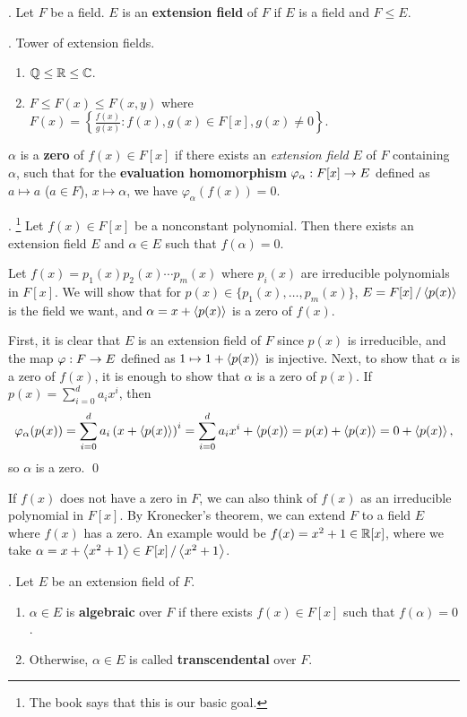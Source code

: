 .  Let \(F\) be a field. \(E\) is an \textbf{extension field} of \(F\) if \(E\) is a field and \(F \leq E\).

\ex. Tower of extension fields.
\begin{enumerate}
    \item \(\mathbb{Q} \leq \mathbb{R} \leq \mathbb{C}\).
    \item \(F \leq F(x) \leq F(x, y)\) where \(F(x) = \left\{\frac{f(x)}{g(x)} : f(x), g(x) \in F[x], g(x) \neq 0\right\}\).
\end{enumerate}

\recall \(\alpha\) is a \textbf{zero} of \(f(x) \in F[x]\) if there exists an \textit{extension field} \(E\) of \(F\) containing \(\alpha\), such that for the \textbf{evaluation homomorphism} \(\varphi_\alpha : F[x] \rightarrow E\) defined as \(a \mapsto a\) (\(a \in F\)), \(x \mapsto \alpha\), we have \(\varphi_\alpha(f(x)) = 0\).

\thm.  \footnote{The book says that this is our basic goal.} Let \(f(x) \in F[x]\) be a nonconstant polynomial. Then there exists an extension field \(E\) and \(\alpha \in E\) such that \(f(\alpha) = 0\).

\pf Let \(f(x) = p_1(x)p_2(x)\cdots p_m(x)\) where \(p_i(x)\) are irreducible polynomials in \(F[x]\). We will show that for \(p(x) \in \{p_1(x), \dots, p_m(x)\}\), \(E = F[x] \operatorname{/} \left\langle p(x) \right\rangle\) is the field we want, and \(\alpha = x + \left\langle p(x) \right\rangle\) is a zero of \(f(x)\).

First, it is clear that \(E\) is an extension field of \(F\) since \(p(x)\) is irreducible, and the map \(\varphi: F \rightarrow E\) defined as \(1 \mapsto 1 + \left\langle p(x) \right\rangle\) is injective. Next, to show that \(\alpha\) is a zero of \(f(x)\), it is enough to show that \(\alpha\) is a zero of \(p(x)\). If \(p(x) = \sum_{i=0}^d a_ix^i\), then
\[
    \varphi_\alpha(p(x)) = \sum_{i=0}^d a_i \left( x + \left\langle p(x) \right\rangle \right)^i = \sum_{i=0}^d a_ix^i + \left\langle p(x) \right\rangle = p(x) + \left\langle p(x) \right\rangle = 0 + \left\langle p(x) \right\rangle,
\]
so \(\alpha\) is a zero. \qed

If \(f(x)\) does not have a zero in \(F\), we can also think of \(f(x)\) as an irreducible polynomial in \(F[x]\). By Kronecker's theorem, we can extend \(F\) to a field \(E\) where \(f(x)\) has a zero. An example would be \(f(x) = x^2 + 1 \in \mathbb{R}[x]\), where we take \(\alpha = x + \left\langle x^2 + 1 \right\rangle \in F[x] \operatorname{/} \left\langle x^2 + 1 \right\rangle\).

. Let \(E\) be an extension field of \(F\).
\begin{enumerate}
    \item \(\alpha \in E\) is \textbf{algebraic} over \(F\) if there exists \(f(x) \in F[x]\) such that \(f(\alpha) = 0\).
    \item Otherwise, \(\alpha \in E\) is called \textbf{transcendental} over \(F\).
\end{enumerate}

